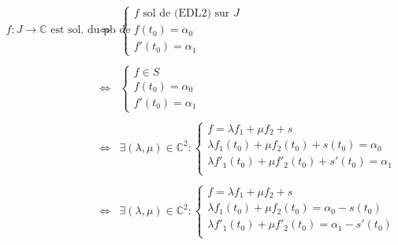 \documentclass{article}
\renewenvironment{question_kholle}[2][ ]
{
	\subsection{\texorpdfstring{#2}{}}
	\notblank{#1}
	{
		\noindent #1
		\bigbreak
	}
	{}
	\begin{proof}
}
{
	\end{proof}
}
\begin{document}
\begin{question_kholle}
	$$\begin{array}{ccl}
			f : J \to \mathbb{C} \text{ est sol. du pb de Cauchy }
			 & \iff & \left\{ \begin{array}{l}
				                  f \text{ sol de (EDL2) sur } J \\
				                  f(t_{0}) = \alpha_{0}          \\
				                  f'(t_{0}) = \alpha_{1}
			                  \end{array}  \right.                                                                                \\\\
			 & \iff & \left\{ \begin{array}{l}
				                  f \in S               \\
				                  f(t_{0}) = \alpha_{0} \\
				                  f'(t_{0}) = \alpha_{1}
			                  \end{array}\right.                                                                                         \\\\
			 & \iff & \exists (\lambda, \mu) \in \mathbb{C}^{2}: \left\{ \begin{array}{l}
				                                                             f = \lambda f_{1} + \mu f_{2} + s                                  \\
				                                                             \lambda f_{1}(t_{0}) + \mu f_{2}(t_{0}) + s(t_{0}) = \alpha_{0}    \\
				                                                             \lambda f'_{1}(t_{0}) + \mu f'_{2}(t_{0}) + s'(t_{0}) = \alpha_{1} \\
			                                                             \end{array} \right. \\\\
			 & \iff & \exists (\lambda, \mu) \in \mathbb{C}^{2}: \left\{ \begin{array}{l}
				                                                             f = \lambda f_{1} + \mu f_{2} + s                                  \\
				                                                             \lambda f_{1}(t_{0}) + \mu f_{2}(t_{0}) = \alpha_{0} - s(t_{0})    \\
				                                                             \lambda f'_{1}(t_{0}) + \mu f'_{2}(t_{0}) = \alpha_{1} - s'(t_{0}) \\

\end{array}
\end{array}$$
\end{question_kholle}
\end{document}
